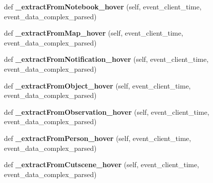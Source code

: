 \begin{DoxyCompactItemize}
def {\bfseries \+\_\+extract\+From\+Notebook\+\_\+hover} (self, event\+\_\+client\+\_\+time, event\+\_\+data\+\_\+complex\+\_\+parsed)
\item 
\mbox{\label{classfeature__extractors_1_1_jowilder_extractor_1_1_jowilder_extractor_a5a54098416a8b564846e23f51b57c0e0}} 
def {\bfseries \+\_\+extract\+From\+Map\+\_\+hover} (self, event\+\_\+client\+\_\+time, event\+\_\+data\+\_\+complex\+\_\+parsed)
\item 
\mbox{\label{classfeature__extractors_1_1_jowilder_extractor_1_1_jowilder_extractor_a77b293d7ccfe8a96b2b15c24da762bcb}} 
def {\bfseries \+\_\+extract\+From\+Notification\+\_\+hover} (self, event\+\_\+client\+\_\+time, event\+\_\+data\+\_\+complex\+\_\+parsed)
\item 
\mbox{\label{classfeature__extractors_1_1_jowilder_extractor_1_1_jowilder_extractor_ad9501fafc97aa17d5c0d987fa65f4938}} 
def {\bfseries \+\_\+extract\+From\+Object\+\_\+hover} (self, event\+\_\+client\+\_\+time, event\+\_\+data\+\_\+complex\+\_\+parsed)
\item 
\mbox{\label{classfeature__extractors_1_1_jowilder_extractor_1_1_jowilder_extractor_a2225ca5bc68c6e9a827beae4cfc89a36}} 
def {\bfseries \+\_\+extract\+From\+Observation\+\_\+hover} (self, event\+\_\+client\+\_\+time, event\+\_\+data\+\_\+complex\+\_\+parsed)
\item 
\mbox{\label{classfeature__extractors_1_1_jowilder_extractor_1_1_jowilder_extractor_a90990620729f8dfc79d1884ecb6b0c68}} 
def {\bfseries \+\_\+extract\+From\+Person\+\_\+hover} (self, event\+\_\+client\+\_\+time, event\+\_\+data\+\_\+complex\+\_\+parsed)
\item 
\mbox{\label{classfeature__extractors_1_1_jowilder_extractor_1_1_jowilder_extractor_a698c2adfd3f71a17b9cb52ea6b778cbb}} 
def {\bfseries \+\_\+extract\+From\+Cutscene\+\_\+hover} (self, event\+\_\+client\+\_\+time, event\+\_\+data\+\_\+complex\+\_\+parsed)

\end{DoxyCompactItemize}
